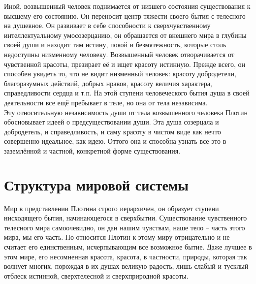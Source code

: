 \documentclass[a4paper,12pt]{article}
\begin{document}
\medskip
Иной, возвышенный человек поднимается от низшего состояния существования к высшему его состоянию. Он переносит центр тяжести своего бытия с телесного на душевное. Он развивает в  себе способности к сверхчувственному интеллектуальному умосозерцанию, он обращается от внешнего мира в глубины своей души и находит там истину, покой и безмятежность, которые столь недоступны низменному человеку. Возвышенный человек отворачивается от чувственной красоты, презирает её и ищет красоту истинную. Прежде всего, он способен увидеть то, что не видит низменный человек: красоту добродетели, благоразумных действий, добрых нравов, красоту величия характера, справедливости сердца и т.п. На этой ступени человеческого бытия душа в своей деятельности все ещё пребывает в теле, но она от тела независима.\\

\medskip
Эту относительную независимость души от тела возвышенного человека Плотин обосновывает идеей о предсуществовании души. Эта душа созерцала и добродетель, и справедливость, и саму красоту в чистом виде как нечто совершенно идеальное, как идею. Оттого она и способна узнать все это в заземлённой и частной, конкретной форме существования.

\newpage
\part{Структура мировой системы}
Мир в представлении Плотина строго иерархичен, он образует ступени нисходящего бытия, начинающегося в сверхбытии. Существование чувственного телесного мира самоочевидно, он дан нашим чувствам, наше тело – часть этого мира, мы его часть. Но относится Плотин к этому миру отрицательно и не считает его единственным, исчерпывающим все возможное бытие. Даже лучшее в этом мире, его несомненная красота, красота, в частности, природы, которая так волнует многих, порождая в их душах великую радость, лишь слабый и тусклый отблеск истинной, сверхтелесной и сверхприродной красоты.\\
\end{document}
